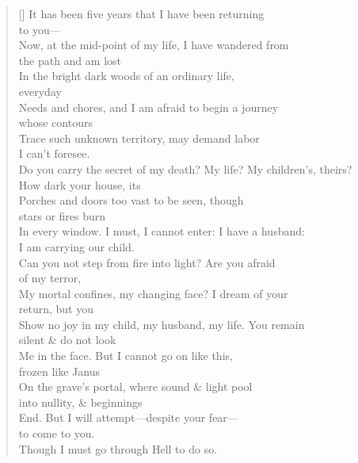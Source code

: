 \label{ch:inferno}
\settowidth{\versewidth}{Do you carry the secret of my death? My life? My children's, theirs?}
\begin{verse}[\versewidth]
It has been five years that I have been returning\\
\hfill to you---\\
Now, at the mid-point of my life, I have wandered from\\
\hfill the path and am lost\\
In the bright dark woods of an ordinary life,\\
\hfill everyday\\
Needs and chores, and I am afraid to begin a journey\\
\hfill whose contours\\
Trace such unknown territory, may demand labor\\
\hfill I can't foresee.\\
Do you carry the secret of my death? My life? My children's, theirs?\\
\hfill How dark your house, its\\
Porches and doors too vast to be seen, though\\
\hfill stars or fires burn\\
In every window. I must, I cannot enter: I have a husband:\\
\hfill I am carrying our child.\\
Can you not step from fire into light? Are you afraid\\
\hfill of my terror,\\
My mortal confines, my changing face? I dream of your\\
\hfill return, but you\\
Show no joy in my child, my husband, my life. You remain\\
\hfill silent \& do not look\\
Me in the face. But I cannot go on like this,\\
\hfill frozen like Janus\\
On the grave's portal, where sound \& light pool\\
\hfill into nullity, \& beginnings\\
End. But I will attempt---despite your fear---\\
\hfill to come to you.\\
Though I must go through Hell to do so.
\end{verse}
